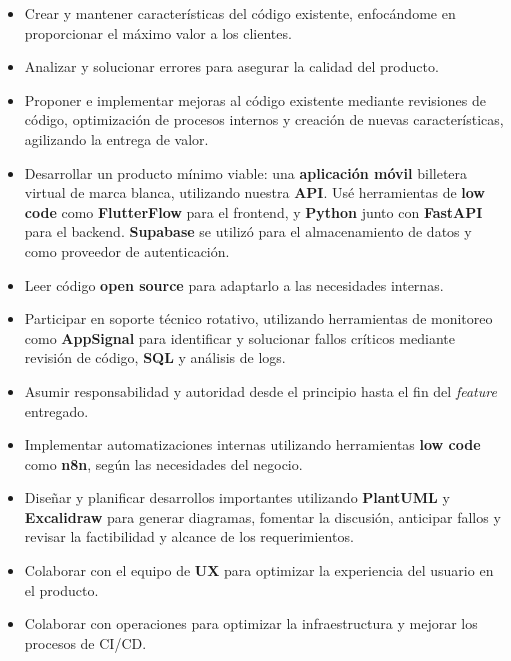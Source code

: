 \documentclass[
    changecolor={111, 156, 45}, 
]{cv-roald}
\begin{document}
\begin{tabularcv}
    \begin{itemize}
          \item Crear y mantener características del código existente, enfocándome en proporcionar el máximo valor a los clientes.
    \item Analizar y solucionar errores para asegurar la calidad del producto.
    \item Proponer e implementar mejoras al código existente mediante revisiones de código, optimización de procesos internos y creación de nuevas características, agilizando la entrega de valor.
    \item Desarrollar un producto mínimo viable: una \textbf{aplicación móvil} billetera virtual de marca blanca, utilizando nuestra \textbf{API}. Usé herramientas de \textbf{low code} como \textbf{FlutterFlow} para el frontend, y \textbf{Python} junto con \textbf{FastAPI} para el backend. \textbf{Supabase} se utilizó para el almacenamiento de datos y como proveedor de autenticación.
    \item Leer código \textbf{open source} para adaptarlo a las necesidades internas.
    \item Participar en soporte técnico rotativo, utilizando herramientas de monitoreo como \textbf{AppSignal} para identificar y solucionar fallos críticos mediante revisión de código, \textbf{SQL} y análisis de logs.
    \item Asumir responsabilidad y autoridad desde el principio hasta el fin del \textit{feature} entregado.
    \item Implementar automatizaciones internas utilizando herramientas \textbf{low code} como \textbf{n8n}, según las necesidades del negocio.
    \item Diseñar y planificar desarrollos importantes utilizando \textbf{PlantUML} y \textbf{Excalidraw} para generar diagramas, fomentar la discusión, anticipar fallos y revisar la factibilidad y alcance de los requerimientos.
    \item Colaborar con el equipo de \textbf{UX} para optimizar la experiencia del usuario en el producto.
    \item Colaborar con operaciones para optimizar la infraestructura y mejorar los procesos de CI/CD.
    \end{itemize}
\end{tabularcv}
\end{document}
